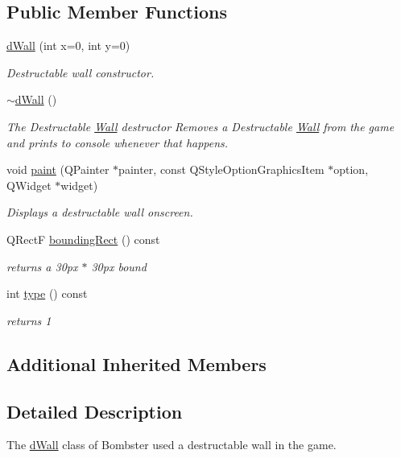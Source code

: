 \subsection*{Public Member Functions}
\begin{DoxyCompactItemize}
\item 
\hyperlink{classd_wall_a09862932157c8e5f8a59b22b3222d816}{d\-Wall} (int x=0, int y=0)
\begin{DoxyCompactList}\small\item\em Destructable wall constructor. \end{DoxyCompactList}\item 
\hyperlink{classd_wall_ae3e072cee7b80cf20387c3d634cb994a}{$\sim$d\-Wall} ()
\begin{DoxyCompactList}\small\item\em The Destructable \hyperlink{class_wall}{Wall} destructor Removes a Destructable \hyperlink{class_wall}{Wall} from the game and prints to console whenever that happens. \end{DoxyCompactList}\item 
void \hyperlink{classd_wall_aeaec158ea8576bfe6d40d8197ffceaf6}{paint} (Q\-Painter $\ast$painter, const Q\-Style\-Option\-Graphics\-Item $\ast$option, Q\-Widget $\ast$widget)
\begin{DoxyCompactList}\small\item\em Displays a destructable wall onscreen. \end{DoxyCompactList}\item 
Q\-Rect\-F \hyperlink{classd_wall_a84d4bba890333394f10c5497379d894c}{bounding\-Rect} () const 
\begin{DoxyCompactList}\small\item\em returns a 30px $\ast$ 30px bound \end{DoxyCompactList}\item 
int \hyperlink{classd_wall_a487ce8ea99822ad1e182e8319db62f9c}{type} () const 
\begin{DoxyCompactList}\small\item\em returns 1 \end{DoxyCompactList}\end{DoxyCompactItemize}
\subsection*{Additional Inherited Members}


\subsection{Detailed Description}
The \hyperlink{classd_wall}{d\-Wall} class of Bombster used a destructable wall in the game. 

